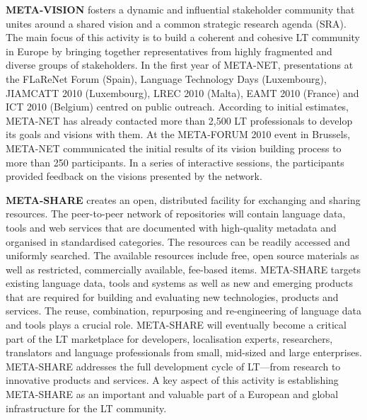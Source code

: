 \documentclass[]{../metanetpaper}
\begin{document}
\begin{Parallel}[c]{80mm}{80mm}
{    \textbf{META-VISION} fosters a dynamic and influential stakeholder community that unites around a shared vision and a common strategic research agenda (SRA). The main focus of this activity is to build a coherent and cohesive LT community in Europe by bringing together representatives from highly fragmented and diverse groups of stakeholders. In the first year of META-NET, presentations at the FLaReNet Forum (Spain), Language Technology Days (Luxembourg), JIAMCATT 2010 (Luxembourg), LREC 2010 (Malta), EAMT 2010 (France) and ICT 2010 (Belgium) centred on public outreach. According to initial estimates, META-NET has already contacted more than 2,500 LT professionals to develop its goals and visions with them. At the META-FORUM 2010 event in Brussels, META-NET communicated the initial results of its vision building process to more than 250 participants. In a series of interactive sessions, the participants provided feedback on the visions presented by the network. 

    \textbf{META-SHARE} creates an open, distributed facility for exchanging and sharing resources. The peer-to-peer network of repositories will contain language data, tools and web services that are documented with high-quality metadata and organised in standardised categories. The resources can be readily accessed and uniformly searched. The available resources include free, open source materials as well as restricted, commercially available, fee-based items. META-SHARE targets existing language data, tools and systems as well as new and emerging products that are required for building and evaluating new technologies, products and services. The reuse, combination, repurposing and re-engineering of language data and tools plays a crucial role. META-SHARE will eventually become a critical part of the LT marketplace for developers, localisation experts, researchers, translators and language professionals from small, mid-sized and large enterprises. META-SHARE addresses the full development cycle of LT—from research to innovative products and services. A key aspect of this activity is establishing META-SHARE as an important and valuable part of a European and global infrastructure for the LT community. 

}
\end{Parallel}
\end{document}
